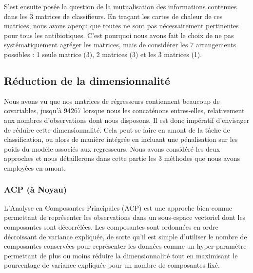 \documentclass[11pt]{article}
\begin{document}
  S'est ensuite posée la question de la mutualisation des informations contenues dans les 3 matrices de classifieurs.
  En traçant les cartes de chaleur de ces matrices, nous avons aperçu que toutes ne sont pas nécessairement pertinentes pour tous les antibiotiques.
  C'est pourquoi nous avons fait le choix de ne pas systématiquement agréger les matrices, mais de considérer les 7 arrangements possibles : 1 seule matrice (3), 2 matrices (3) et les 3 matrices (1).

\hypertarget{reduction-dimension}{%
\subsection{Réduction de la dimensionnalité}\label{reduction-dimension}}

  Nous avons vu que nos matrices de régresseurs contiennent beaucoup de covariables, jusqu'à 94267 lorsque nous les concaténons entres-elles, relativement aux nombres d'observations dont nous disposons.
  Il est donc impératif d'envisager de réduire cette dimensionnalité.
  Cela peut se faire en amont de la tâche de classification, ou alors de manière intégrée en incluant une pénalisation sur les poids du modèle associés aux regresseurs.
  Nous avons considéré les deux approches et nous détaillerons dans cette partie les 3 méthodes que nous avons employées en amont.

\hypertarget{acp-noyau}{%
\subsubsection{ACP (à Noyau)}\label{acp-noyau}}

  L'Analyse en Composantes Principales (ACP) est une approche bien connue permettant de représenter les observations dans un sous-espace vectoriel dont les composantes sont décorrélées.
  Les composantes sont ordonnées en ordre décroissant de variance expliquée, de sorte qu'il est simple d'utiliser le nombre de composantes conservées pour représenter les données comme un hyper-paramètre permettant de plus ou moins réduire la dimensionnalité tout en maximisant le pourcentage de variance expliquée pour un nombre de composantes fixé.
\end{document}

